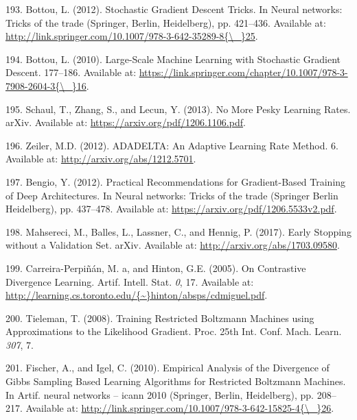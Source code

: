 \documentclass[11pt,a4paper,twoside]{book}
\theoremstyle{definition}
\theoremstyle{definition}
\theoremstyle{remark}
\begin{document}
\hypertarget{ref-Bottou2012}{}
193. Bottou, L. (2012). Stochastic Gradient Descent Tricks. In Neural
networks: Tricks of the trade (Springer, Berlin, Heidelberg), pp.
421--436. Available at:
\href{http://link.springer.com/10.1007/978-3-642-35289-8\%7B/_\%7D25}{http://link.springer.com/10.1007/978-3-642-35289-8\{\textbackslash{}\_\}25}.

\hypertarget{ref-Bottou2010}{}
194. Bottou, L. (2010). Large-Scale Machine Learning with Stochastic
Gradient Descent. 177--186. Available at:
\href{https://link.springer.com/chapter/10.1007/978-3-7908-2604-3\%7B/_\%7D16}{https://link.springer.com/chapter/10.1007/978-3-7908-2604-3\{\textbackslash{}\_\}16}.

\hypertarget{ref-Schaul2013}{}
195. Schaul, T., Zhang, S., and Lecun, Y. (2013). No More Pesky Learning
Rates. arXiv. Available at: \url{https://arxiv.org/pdf/1206.1106.pdf}.

\hypertarget{ref-Zeiler2012}{}
196. Zeiler, M.D. (2012). ADADELTA: An Adaptive Learning Rate Method. 6.
Available at: \url{http://arxiv.org/abs/1212.5701}.

\hypertarget{ref-Bengio2012}{}
197. Bengio, Y. (2012). Practical Recommendations for Gradient-Based
Training of Deep Architectures. In Neural networks: Tricks of the trade
(Springer Berlin Heidelberg), pp. 437--478. Available at:
\url{https://arxiv.org/pdf/1206.5533v2.pdf}.

\hypertarget{ref-Mahsereci2017}{}
198. Mahsereci, M., Balles, L., Lassner, C., and Hennig, P. (2017).
Early Stopping without a Validation Set. arXiv. Available at:
\url{http://arxiv.org/abs/1703.09580}.

\hypertarget{ref-Carreira-Perpinan2005}{}
199. Carreira-Perpiñán, M. a, and Hinton, G.E. (2005). On Contrastive
Divergence Learning. Artif. Intell. Stat. \emph{0}, 17. Available at:
\href{http://learning.cs.toronto.edu/\%7B~\%7Dhinton/absps/cdmiguel.pdf}{http://learning.cs.toronto.edu/\{\textasciitilde{}\}hinton/absps/cdmiguel.pdf}.

\hypertarget{ref-Tieleman2008}{}
200. Tieleman, T. (2008). Training Restricted Boltzmann Machines using
Approximations to the Likelihood Gradient. Proc. 25th Int. Conf. Mach.
Learn. \emph{307}, 7.

\hypertarget{ref-Fischer2010}{}
201. Fischer, A., and Igel, C. (2010). Empirical Analysis of the
Divergence of Gibbs Sampling Based Learning Algorithms for Restricted
Boltzmann Machines. In Artif. neural networks -- icann 2010 (Springer,
Berlin, Heidelberg), pp. 208--217. Available at:
\href{http://link.springer.com/10.1007/978-3-642-15825-4\%7B/_\%7D26}{http://link.springer.com/10.1007/978-3-642-15825-4\{\textbackslash{}\_\}26}.
\end{document}
